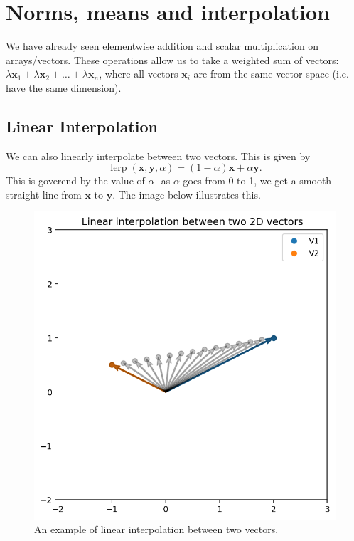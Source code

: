 \documentclass[a4paper, openany]{memoir}
\begin{document}
    \section{Norms, means and interpolation}
    We have already seen elementwise addition and scalar multiplication on arrays/vectors. These operations allow us to take a weighted sum of vectors: $\lambda \mathbf{x}_1 + \lambda \mathbf{x}_2 + \dots + \lambda \mathbf{x}_n$, where all vectors $\mathbf{x}_i$ are from the same vector space (i.e. have the same dimension).

    \subsection{Linear Interpolation}
    We can also linearly interpolate between two vectors. This is given by
    \[\operatorname{lerp}(\mathbf{x}, \mathbf{y}, \alpha) = (1 - \alpha) \mathbf{x} + \alpha \mathbf{y}.\]
    This is goverend by the value of $\alpha$- as $\alpha$ goes from 0 to 1, we get a smooth straight line from $\mathbf{x}$ to $\mathbf{y}$. The image below illustrates this.
    \begin{figure}[H]
        \centering
        \includegraphics[scale=0.7]{src/3.1 lerp.png}
        \caption{An example of linear interpolation between two vectors.}
    \end{figure}
\end{document}
